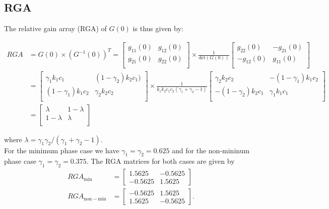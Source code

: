 \documentclass[a4paper,12pt,oneside,onecolumn]{article}
\begin{document}
\subsection{RGA}
The relative gain array (RGA) of $G(0)$ is thus given by:
\begin{footnotesize}
\begin{align}
RGA & = G(0)\times(G^{-1}(0))^T = 
\begin{bmatrix}
g_{11}(0) & g_{12}(0) \\
g_{21}(0) & g_{22}(0) \\
\end{bmatrix}
\times
\frac{1}{\textrm{det}(G(0))}
\begin{bmatrix}
g_{22}(0) & -g_{21}(0) \\
-g_{12}(0) & g_{11}(0) \\
\end{bmatrix} \\
& = \begin{bmatrix}
\gamma_1 k_1 c_1 & (1-\gamma_2) k_2 c_1) \\
(1-\gamma_1) k_1 c_2 & \gamma_2 k_2 c_2 \\
\end{bmatrix}
\times
\frac{1}{k_1 k_2 c_1 c_2 (\gamma_1 + \gamma_2 - 1)}
\begin{bmatrix}
\gamma_2 k_2 c_2 & -(1-\gamma_1) k_1 c_2 \\
-(1-\gamma_2) k_2 c_1 & \gamma_1 k_1 c_1 \\
\end{bmatrix}\\
& = 
\begin{bmatrix}
\lambda & 1-\lambda \\
1-\lambda & \lambda \\
\end{bmatrix}
\end{align}
\end{footnotesize}
where $\lambda = \gamma_1\gamma_2/(\gamma_1 + \gamma_2 - 1)$.\\
For the minimum phase case we have $\gamma_1 = \gamma_2 = 0.625$ and for the non-mininum phase case $\gamma_1 = \gamma_2 = 0.375$. The RGA matrices for both cases are given by
\begin{align}
    RGA_\mathrm{min} &= \begin{bmatrix}
    1.5625 & -0.5625\\
    -0.5625 & 1.5625
    \end{bmatrix} \\
    RGA_\mathrm{non-min} &= \begin{bmatrix}
    -0.5625 & 1.5625\\
    1.5625 & -0.5625
    \end{bmatrix}.
\end{align}
\end{document}
